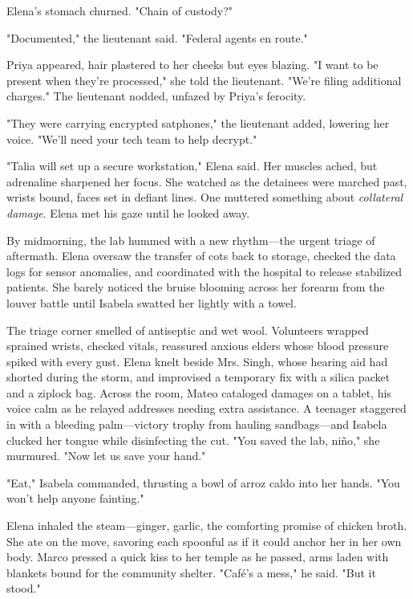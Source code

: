 Elena's stomach churned. "Chain of custody?"

"Documented," the lieutenant said. "Federal agents en route."

Priya appeared, hair plastered to her cheeks but eyes blazing. "I want to be present when they're processed," she told the lieutenant. "We're filing additional charges." The lieutenant nodded, unfazed by Priya's ferocity.

"They were carrying encrypted satphones," the lieutenant added, lowering her voice. "We'll need your tech team to help decrypt."

"Talia will set up a secure workstation," Elena said. Her muscles ached, but adrenaline sharpened her focus. She watched as the detainees were marched past, wrists bound, faces set in defiant lines. One muttered something about \textit{collateral damage}. Elena met his gaze until he looked away.

\bigskip

By midmorning, the lab hummed with a new rhythm—the urgent triage of aftermath. Elena oversaw the transfer of cots back to storage, checked the data logs for sensor anomalies, and coordinated with the hospital to release stabilized patients. She barely noticed the bruise blooming across her forearm from the louver battle until Isabela swatted her lightly with a towel.

The triage corner smelled of antiseptic and wet wool. Volunteers wrapped sprained wrists, checked vitals, reassured anxious elders whose blood pressure spiked with every gust. Elena knelt beside Mrs. Singh, whose hearing aid had shorted during the storm, and improvised a temporary fix with a silica packet and a ziplock bag. Across the room, Mateo cataloged damages on a tablet, his voice calm as he relayed addresses needing extra assistance. A teenager staggered in with a bleeding palm—victory trophy from hauling sandbags—and Isabela clucked her tongue while disinfecting the cut. "You saved the lab, niño," she murmured. "Now let us save your hand."

"Eat," Isabela commanded, thrusting a bowl of arroz caldo into her hands. "You won't help anyone fainting."

Elena inhaled the steam—ginger, garlic, the comforting promise of chicken broth. She ate on the move, savoring each spoonful as if it could anchor her in her own body. Marco pressed a quick kiss to her temple as he passed, arms laden with blankets bound for the community shelter. "Café's a mess," he said. "But it stood."

